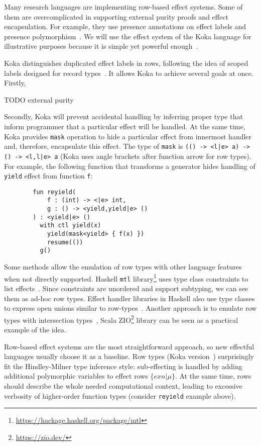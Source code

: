 \documentclass[conference]{IEEEtran}
\begin{document}
    Many research languages are implementing row-based effect systems.
    Some of them are overcomplicated in supporting external purity proofs and effect encapsulation.
    For example, they use presence annotations on effect labels and presence polymorphism~\cite{hillerstrom2016liberating}.
    We will use the effect system of the Koka language for illustrative purposes because it is simple yet powerful enough~\cite{leijen2014koka, leijen2017type}.

    Koka distinguishes duplicated effect labels in rows, following the idea of scoped labels designed for record types~\cite{leijen2005extensible}.
    It allows Koka to achieve several goals at once.
    Firstly,

    TODO external purity

    Secondly, Koka will prevent accidental handling by inferring proper type that inform programmer that a particular effect will be handled.
    At the same time, Koka provides \texttt{mask} operation to hide a particular effect from innermost handler and, therefore, encapsulate this effect.
    The type of \texttt{mask} is \texttt{(() -> <l|e> a) -> () -> <l,l|e> a} (Koka uses angle brackets after function arrow for row types).
    For example, the following function that transforms a generator hides handling of \texttt{yield} effect from function \texttt{f}:
    \begin{verbatim}
        fun reyield(
            f : (int) -> <|e> int,
            g : () -> <yield,yield|e> ()
        ) : <yield|e> ()
          with ctl yield(x)
            yield(mask<yield> { f(x) })
            resume(())
          g()
    \end{verbatim}


    Some methods allow the emulation of row types with other language features when not directly supported.
    Haskell \texttt{mtl} library\footnote{\url{https://hackage.haskell.org/package/mtl}} uses type class constraints to list effects~\cite{jones1995functional}.
    Since constraints are unordered and support subtyping, we can see them as ad-hoc row types.
    Effect handler libraries in Haskell also use type classes to express open unions similar to row-types~\cite{swierstra2008data}.
    Another approach is to emulate row types with intersection types~\cite{xie2020row}, Scala ZIO\footnote{\url{https://zio.dev/}} library can be seen as a practical example of the idea.

    Row-based effect systems are the most straightforward approach, so new effectful languages usually choose it as a baseline.
    Row types (Koka version~\cite{leijen2014koka, leijen2017type}) surprisingly fit the Hindley-Milner type inference style: sub-effecting is handled by adding additional polymorphic variables to effect rows $\{exn|\mu\}$.
    At the same time, rows should describe the whole needed computational context, leading to excessive verbosity of higher-order function types (consider \texttt{reyield} example above).
\end{document}
